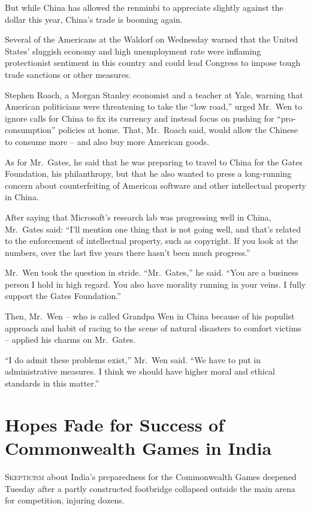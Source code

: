 ﻿\documentclass[12pt]{article}
\begin{document}
But while China has allowed the renminbi to appreciate slightly against the dollar this year,
China's trade is booming again.

Several of the Americans at the Waldorf on Wednesday warned that the United States' sluggish economy
and high unemployment rate were inflaming protectionist sentiment in this country and could lead
Congress to impose tough trade sanctions or other measures.

Stephen Roach, a Morgan Stanley economist and a teacher at Yale, warning that American politicians
were threatening to take the ``low road,'' urged Mr.~Wen to ignore calls for China to fix its
currency and instead focus on pushing for ``pro-consumption'' policies at home. That, Mr.~Roach
said, would allow the Chinese to consume more -- and also buy more American goods.

As for Mr.~Gates, he said that he was preparing to travel to China for the Gates Foundation, his
philanthropy, but that he also wanted to press a long-running concern about counterfeiting of
American software and other intellectual property in China.

After saying that Microsoft's research lab was progressing well in China, Mr.~Gates said: ``I'll
mention one thing that is not going well, and that's related to the enforcement of intellectual
property, such as copyright. If you look at the numbers, over the last five years there hasn't been
much progress.''

Mr.~Wen took the question in stride. ``Mr.~Gates,'' he said. ``You are a business person I hold in
high regard. You also have morality running in your veins. I fully support the Gates Foundation.''

Then, Mr.~Wen -- who is called Grandpa Wen in China because of his populist approach and habit of
racing to the scene of natural disasters to comfort victims -- applied his charms on Mr.~Gates.

``I do admit these problems exist,'' Mr.~Wen said. ``We have to put in administrative measures. I
think we should have higher moral and ethical standards in this matter.''

\pagebreak
\section{Hopes Fade for Success of Commonwealth Games in India}

\lettrine{S}{kepticism} about India's preparedness for the Commonwealth
Games deepened Tuesday after a partly constructed footbridge collapsed outside the main arena for
competition, injuring dozens.
\end{document}
